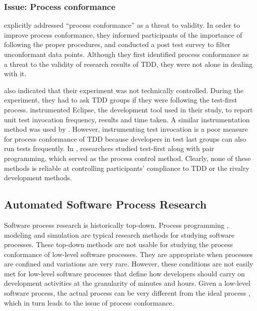\documentclass[smallextended]{svjour3}     %
\begin{document}
\subsubsection{Issue: Process conformance}

\cite{Erdogmus:05} explicitly addressed
``process conformance'' as a threat to validity.
In order to improve process conformance,
they informed participants of the importance of following the 
proper procedures, and conducted a post test survey to filter 
unconformant data points. Although they first
identified process conformance as a threat to the validity 
of research results of TDD, they were not alone in 
dealing with it. 

\cite{Muller:02} also indicated that their experiment was not technically
controlled.  During the experiment, they had to ask TDD groups if they were
following the test-first process.  \cite{Matjaz:03} instrumented Eclipse,
the development tool used in their study, to report unit test invocation
frequency, results and time taken. A similar instrumentation method was
used by \cite{Geras:04}. However, instrumenting test invocation is a poor
measure for process conformance of TDD because developers in test last
groups can also run tests frequently. In
\citep{George:03,Williams:03,Maximilien:03}, researchers studied test-first
along with pair programming, which served as the process control
method. Clearly, none of these methods is reliable at controlling
participants' compliance to TDD or the rivalry development methods.

\subsection{Automated Software Process Research}
\label{sec:related-automation}
Software process research is historically top-down. Process
programming \citep{Sutton:95}, modeling \citep{Curtis:92} and 
simulation \citep{Turnu:04,Jensen:05} are typical research 
methods for studying software processes. These top-down
methods are not usable for studying the process conformance of 
low-level software processes. They are appropriate when 
processes are confined and variations are very rare. 
However, these conditions are not easily met for low-level
software processes that define how developers should carry
on development activities at the granularity of minutes
and hours. Given a low-level software process, the actual 
process can be very different from the ideal process 
\citep{csdl-98-04,csdl2-06-01,csdl2-01-12}, which in turn leads 
to the issue of process conformance. 
\end{document}
